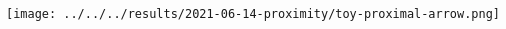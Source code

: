 \documentclass[17pt,a1paper]{tikzposter} %
\begin{document}
\begin{columns}
{\begin{multicols}{3}
\texttt{[image: ../../../results/2021-06-14-proximity/toy-proximal-arrow.png]}

\end{multicols}

%
}



\block{}{
\tiny

}

\end{columns}
\end{document}
